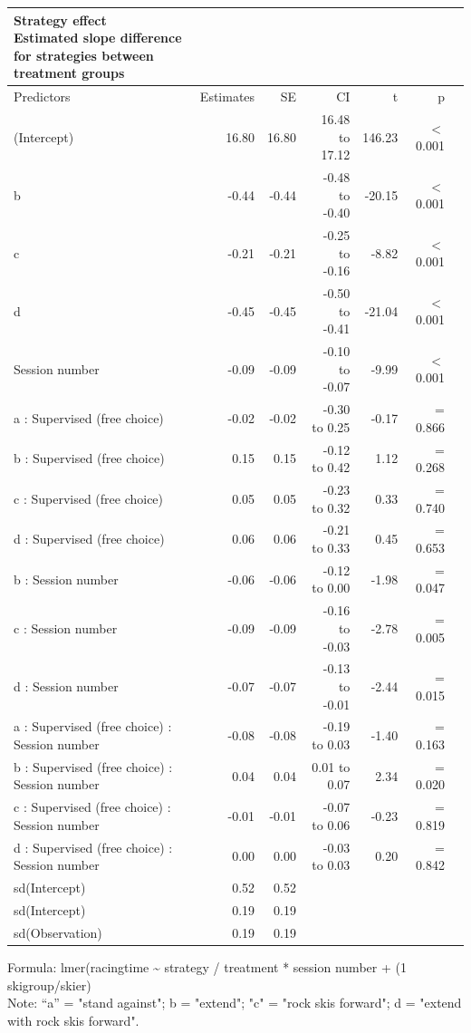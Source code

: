 \documentclass[pdflatex,sn-mathphys-num]{sn-jnl}%
\theoremstyle{thmstyleone}%
\theoremstyle{thmstyletwo}%
\theoremstyle{thmstylethree}%
\begin{document}
\begin{appendices}
\setlength{\LTpost}{0mm}
\begin{longtable}{lrrrrrl}
\caption*{
{\large Strategy effect} \\ 
{\small Estimated slope difference for strategies between treatment groups}
} \\ 
\toprule
Predictors & Estimates & SE & CI & t & p \\
\midrule\addlinespace[2.5pt]
(Intercept) & 16.80 & 16.80 & 16.48 to 17.12 & 146.23 &  $<$  0.001 \\ 
b & -0.44 & -0.44 & -0.48 to -0.40 & -20.15 &  $<$  0.001 \\ 
c & -0.21 & -0.21 & -0.25 to -0.16 & -8.82 &  $<$  0.001 \\ 
d & -0.45 & -0.45 & -0.50 to -0.41 & -21.04 &  $<$  0.001 \\ 
Session number & -0.09 & -0.09 & -0.10 to -0.07 & -9.99 &  $<$  0.001 \\ 
a : Supervised (free choice) & -0.02 & -0.02 & -0.30 to 0.25 & -0.17 &  =  0.866 \\ 
b : Supervised (free choice) & 0.15 & 0.15 & -0.12 to 0.42 & 1.12 &  =  0.268 \\ 
c : Supervised (free choice) & 0.05 & 0.05 & -0.23 to 0.32 & 0.33 &  =  0.740 \\ 
d : Supervised (free choice) & 0.06 & 0.06 & -0.21 to 0.33 & 0.45 &  =  0.653 \\ 
b : Session number & -0.06 & -0.06 & -0.12 to 0.00 & -1.98 &  =  0.047 \\ 
c : Session number & -0.09 & -0.09 & -0.16 to -0.03 & -2.78 &  =  0.005 \\ 
d : Session number & -0.07 & -0.07 & -0.13 to -0.01 & -2.44 &  =  0.015 \\ 
a : Supervised (free choice) : Session number & -0.08 & -0.08 & -0.19 to 0.03 & -1.40 &  =  0.163 \\ 
b : Supervised (free choice) : Session number & 0.04 & 0.04 & 0.01 to 0.07 & 2.34 &  =  0.020 \\ 
c : Supervised (free choice) : Session number & -0.01 & -0.01 & -0.07 to 0.06 & -0.23 &  =  0.819 \\ 
d : Supervised (free choice) : Session number & 0.00 & 0.00 & -0.03 to 0.03 & 0.20 &  =  0.842 \\ 
sd(Intercept) & 0.52 & 0.52 &  &  &  & \\ 
sd(Intercept) & 0.19 & 0.19 &  &  &  & \\ 
sd(Observation) & 0.19 & 0.19 &  &  &  & \\ 
\bottomrule
\end{longtable}
\begin{minipage}{\linewidth}
Formula: lmer(racingtime \textasciitilde{} strategy / treatment * session number + (1 \textbar{} skigroup/skier)\\
Note: “a” = "stand against"; b = "extend"; "c" = "rock skis forward"; d = "extend with rock skis forward".\\
\end{minipage}
\clearpage


\end{appendices}
\end{document}
